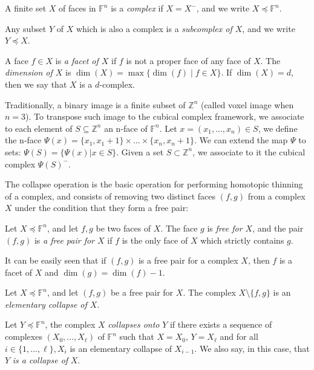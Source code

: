 \documentclass[final,envcountsame]{llncs}
\def\myem#1{{\em #1}}
\def\V2C{\Psi}
\def\Zset{\Z}
\def\Z{\mathbb{Z}}
\def\allfaces#1{\mathbb{F}^{#1}}
\def\subcomplex#1#2{#1 \preceq #2}
\def\complex#1#2{\subcomplex{#2}{\allfaces{#1}}}
\def\closure#1{#1^-}
\def\mydim#1{\dim(#1)}
\def\suchthat{\;|\;}
\def\dinterval#1#2{\{#1,\ldots,#2\}}
\begin{document}
\begin{definition}
A finite set $X$ of faces in $\allfaces{n}$ is a \myem{complex} if $X=\closure{X}$, and we write $\complex{n}{X}$. 

Any subset $Y$ of $X$ which is also a complex is a \myem{subcomplex of $X$}, and we write $\subcomplex{Y}{X}$.
\end{definition}



A face $f \in X$ is \myem{a facet of $X$} if $f$ is not a proper face of any face of $X$. The \myem{dimension of $X$} is $\mydim{X} = \max\{\mydim{f} \suchthat f \in X\}$. If $\mydim{X} = d$, then we say that $X$ is a $d$-complex.

Traditionally, a binary image is a finite subset of $\Zset^n$ (called voxel image when $n=3$). To transpose such image to the cubical complex framework, we associate to each element of $S\subseteq \Zset^n$ an n-face of $\allfaces{n}$. Let $x=(x_1,...,x_n) \in S$, we define the n-face $\V2C(x) = \{x_1, x_1 + 1\} \times \ldots \times \{x_n, x_n + 1\}$. We can extend the map $\V2C$ to sets: $\V2C(S)=\{\V2C(x) | x \in S\}$. Given a set $S \subset \Zset^n$, we associate to it the cubical complex $\closure{\V2C(S)}$.

The collapse operation is the basic operation for performing homotopic thinning of a complex, and consists of removing two distinct faces $(f,g)$ from a complex $X$ under the condition that they form a free pair:

\begin{definition}
Let $\complex{n}{X}$, and let $f,g$ be two faces of $X$. The face $g$ is \myem{free for $X$}, and the pair $(f,g)$ is \myem{a free pair for $X$} if $f$ is the only face of $X$ which strictly contains $g$. 
\end{definition}

It can be easily seen that if $(f,g)$ is a free pair for a complex $X$, then $f$ is a facet of $X$ and $\dim(g) = \dim(f)-1$.

\begin{definition}
Let $\complex{n}{X}$, and let $(f,g)$ be a free pair for $X$. The complex $X \setminus \{f,g\}$ is an \myem{elementary collapse of $X$}.

Let $\complex{n}{Y}$, the complex $X$ \myem{collapses onto} $Y$ if there exists a sequence of complexes $(X_0,...,X_\ell)$ of $\allfaces{n}$ such that $X=X_0$, $Y=X_\ell$ and for all $i \in \dinterval{1}{\ell}, X_{i}$ is an elementary collapse of $X_{i-1}$. We also say, in this case, that $Y$ \myem{is a collapse of} $X$.
\end{definition}
\end{document}
